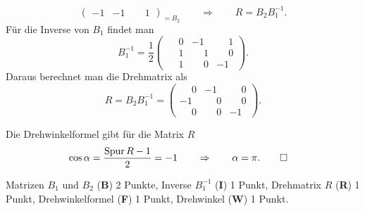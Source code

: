 \begin{loesung}
\begin{teilaufgaben}
\[{\begin{pmatrix}
         - 1&-1&\phantom{-}1
\end{pmatrix}}_{\displaystyle =B_2}
\qquad \Rightarrow\qquad
R=B_2B_1^{-1}.
\]
Für die Inverse von $B_1$ findet man
%
%
%
\[
B_1^{-1}
=
\frac12
\begin{pmatrix}
\phantom{-}0&         - 1&\phantom{-}1\\
\phantom{-}1&\phantom{-}1&\phantom{-}0\\
\phantom{-}1&\phantom{-}0&         - 1
\end{pmatrix}.
\]
Daraus berechnet man die Drehmatrix als
\[
R=B_2B_1^{-1}
=
\begin{pmatrix}
\phantom{-}0&         - 1&\phantom{-}0\\
         - 1&\phantom{-}0&\phantom{-}0\\
\phantom{-}0&\phantom{-}0&         - 1
\end{pmatrix}.
\]
\item
Die Drehwinkelformel gibt für die Matrix $R$
\begin{align*}
\cos \alpha 
&=
\frac{\operatorname{Spur}R-1}2=-1
\qquad\Rightarrow\qquad\alpha=\pi.
\qedhere
\end{align*}
\end{teilaufgaben}
\end{loesung}

\begin{bewertung}
Matrizen $B_1$ und $B_2$ ({\bf B}) 2 Punkte,
Inverse $B_1^{-1}$ ({\bf I}) 1 Punkt,
Drehmatrix $R$ ({\bf R}) 1 Punkt,
Drehwinkelformel ({\bf F}) 1 Punkt,
Drehwinkel ({\bf W}) 1 Punkt.
\end{bewertung}



